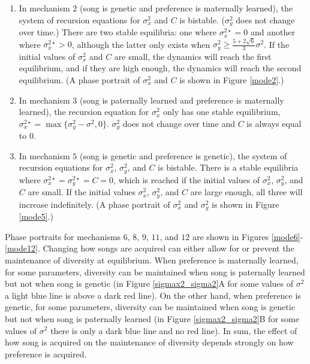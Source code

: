 \documentclass[12pt]{article}
\begin{document}
\begin{enumerate}
\item
In mechanism $2$ (song is genetic and preference is maternally learned), the system of recursion equations for $\sigma_x^2$ and $C$ is bistable. ($\sigma_y^2$ does not change over time.) There are two stable equilibria: one where $\sigma_x^{2\star}=0$ and another where $\sigma_x^{2\star}>0$, although the latter only exists when $\sigma_y^2\geq\frac{5+2\sqrt{6}}{3}\sigma^2$. If the initial values of $\sigma_x^2$ and $C$ are small, the dynamics will reach the first equilibrium, and if they are high enough, the dynamics will reach the second equilibrium. (A phase portrait of $\sigma_x^2$ and $C$ is shown in Figure \ref{mode2}.) 
\item In mechanism $3$ (song is paternally learned and preference is maternally learned), the recursion equation for $\sigma_x^2$ only has one stable equilibrium, $\sigma_x^{2\star}=\max\{\sigma_y^2-\sigma^2,0\}$. $\sigma_y^2$ does not change over time and $C$ is always equal to $0$.
\item In mechanism $5$ (song is genetic and preference is genetic), the system of recursion equations for $\sigma_x^2$, $\sigma_y^2$, and $C$ is bistable. There is a stable equilibria where $\sigma_x^{2\star}=\sigma_y^{2\star}=C=0$, which is reached if the initial values of $\sigma_x^2$, $\sigma_y^2$, and $C$ are small. If the initial values $\sigma_x^2$, $\sigma_y^2$, and $C$ are large enough, all three will increase indefinitely. (A phase portrait of $\sigma_x^2$ and $\sigma_y^2$ is shown in Figure \ref{mode5}.)
\end{enumerate}
Phase portraits for mechanisms $6$, $8$, $9$, $11$, and $12$ are shown in Figures \ref{mode6}-\ref{mode12}.
Changing how songs are acquired can either allow for or prevent the maintenance of diversity at equilibrium. When preference is maternally learned, for some parameters, diversity can be maintained when song is paternally learned but not when song is genetic (in Figure \ref{sigmax2_sigma2}A for some values of $\sigma^2$ a light blue line is above a dark red line). On the other hand, when preference is genetic, for some parameters, diversity can be maintained when song is genetic but not when song is paternally learned (in Figure \ref{sigmax2_sigma2}B for some values of $\sigma^2$ there is only a dark blue line and no red line). In sum, the effect of how song is acquired on the maintenance of diversity depends strongly on how preference is acquired.

\end{document}

